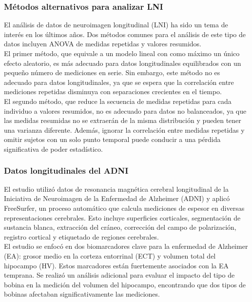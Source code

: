 \documentclass[12pt]{article}
\begin{document}
\subsubsection{Métodos alternativos para analizar LNI}

El análisis de datos de neuroimagen longitudinal (LNI) ha sido un tema de interés en los últimos años. Dos métodos comunes para el análisis de este tipo de datos incluyen ANOVA de medidas repetidas y valores resumidos.\\ 

El primer método, que equivale a un modelo lineal con como máximo un único efecto aleatorio, es más adecuado para datos longitudinales equilibrados con un pequeño número de mediciones en serie. Sin embargo, este método no es adecuado para datos longitudinales, ya que se espera que la correlación entre mediciones repetidas disminuya con separaciones crecientes en el tiempo.\\

 El segundo método, que reduce la secuencia de medidas repetidas para cada individuo a valores resumidos, no es adecuado para datos no balanceados, ya que las medidas resumidas no se extraerán de la misma distribución y pueden tener una varianza diferente. Además, ignorar la correlación entre medidas repetidas y omitir sujetos con un solo punto temporal puede conducir a una pérdida significativa de poder estadístico.


\subsubsection{Datos longitudinales del ADNI}

El estudio utilizó datos de resonancia magnética cerebral longitudinal de la Iniciativa de Neuroimagen de la Enfermedad de Alzheimer (ADNI) y aplicó FreeSurfer, un proceso automático que calcula mediciones de espesor en diversas representaciones cerebrales. Esto incluye superficies corticales, segmentación de sustancia blanca, extracción del cráneo, corrección del campo de polarización, registro cortical y etiquetado de regiones cerebrales.\\

El estudio se enfocó en dos biomarcadores clave para la enfermedad de Alzheimer (EA): grosor medio en la corteza entorrinal (ECT) y volumen total del hipocampo (HV). Estos marcadores están fuertemente asociados con la EA temprana. Se realizó un análisis adicional para evaluar el impacto del tipo de bobina en la medición del volumen del hipocampo, encontrando que dos tipos de bobinas afectaban significativamente las mediciones.\\
\end{document}
